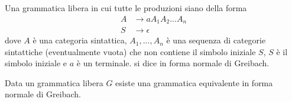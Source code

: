 \documentclass[12pt]{article}
\numberwithin{theorem}{subsection}
\begin{document}
\begin{definition}
	Una grammatica libera in cui tutte le produzioni siano della forma
	\begin{align*}
	A &\rightarrow aA_1A_2...A_n \\
	S &\rightarrow \epsilon
	\end{align*}
	dove $A$ è una categoria sintattica, $A_1, ..., A_n$ è una sequenza di categorie sintattiche (eventualmente vuota) che non contiene il simbolo iniziale $S$, $S$ è il simbolo iniziale e $a$ è un terminale.
	si dice in forma normale di Greibach.
\end{definition}

\begin{theorem}
	Data un grammatica libera $G$ esiste una grammatica equivalente in forma normale di Greibach.
\end{theorem}
\end{document}
